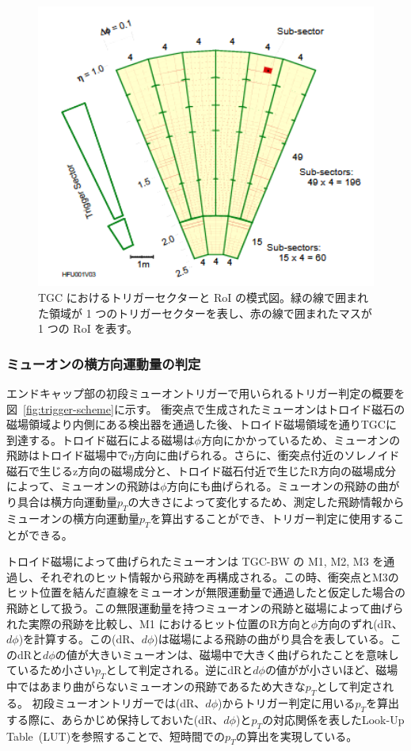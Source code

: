 \begin{figure}[tb]
  \centering
  \includegraphics[clip, width=13cm]{fig/3/RoI.png}
  \caption{TGC におけるトリガーセクターと RoI の模式図。緑の線で囲まれた領域が 1 つのトリガーセクターを表し、赤の線で囲まれたマスが 1 つの RoI を表す。}
  \label{fig:RoI}
\end{figure}


\subsubsection{ミューオンの横方向運動量の判定}
エンドキャップ部の初段ミューオントリガーで用いられるトリガー判定の概要を図~\ref{fig:trigger-scheme}に示す。
衝突点で生成されたミューオンはトロイド磁石の磁場領域より内側にある検出器を通過した後、トロイド磁場領域を通りTGCに到達する。トロイド磁石による磁場は$\phi$方向にかかっているため、ミューオンの飛跡はトロイド磁場中で$\eta$方向に曲げられる。さらに、衝突点付近のソレノイド磁石で生じるz方向の磁場成分と、トロイド磁石付近で生じたR方向の磁場成分によって、ミューオンの飛跡は$\phi$方向にも曲げられる。ミューオンの飛跡の曲がり具合は横方向運動量$p_T$の大きさによって変化するため、測定した飛跡情報からミューオンの横方向運動量$p_T$を算出することができ、トリガー判定に使用することができる。

トロイド磁場によって曲げられたミューオンは TGC-BW の M1, M2, M3 を通過し、それぞれのヒット情報から飛跡を再構成される。この時、衝突点とM3のヒット位置を結んだ直線をミューオンが無限運動量で通過したと仮定した場合の飛跡として扱う。この無限運動量を持つミューオンの飛跡と磁場によって曲げられた実際の飛跡を比較し、M1 におけるヒット位置のR方向と$\phi$方向のずれ(dR、$d\phi$)を計算する。この(dR、$d\phi$)は磁場による飛跡の曲がり具合を表している。このdRと$d\phi$の値が大きいミューオンは、磁場中で大きく曲げられたことを意味しているため小さい$p_T$として判定される。逆にdRと$d\phi$の値がが小さいほど、磁場中ではあまり曲がらないミューオンの飛跡であるため大きな$p_T$として判定される。
初段ミューオントリガーでは(dR、$d\phi$)からトリガー判定に用いる$p_T$を算出する際に、あらかじめ保持しておいた(dR、$d\phi$)と$p_T$の対応関係を表したLook-Up Table~(LUT)を参照することで、短時間での$p_T$の算出を実現している。

